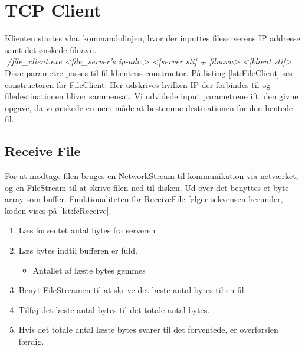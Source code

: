 \section{TCP Client}
Klienten startes vha. kommandolinjen, hvor der inputtes fileserverens IP addresse samt det ønskede filnavn. \\ \textit{./file\_client.exe  <file\_server’s ip-adr.> <[server sti] + filnavn> <[klient sti]>} \\

Disse parametre passes til fil klientens constructor. På listing \ref{lst:FileClient} ses constructoren for FileClient. Her udskrives hvilken IP der forbindes til og filedestinationen bliver sammensat. Vi udvidede input parametrene ift. den givne opgave, da vi ønskede en nem måde at bestemme destinationen for den hentede fil.


\subsection{Receive File}
For at modtage filen bruges en NetworkStream til kommunikation via netværket, og en FileStream til at skrive filen ned til disken. Ud over det benyttes et byte array som buffer. Funktionaliteten for ReceiveFile følger sekvensen herunder, koden vises på \ref{lst:fcReceive}.

\begin{enumerate}
	\item Læs forventet antal bytes fra serveren
	\item Læs bytes indtil bufferen er fuld.
	\begin{itemize}
		\item Antallet af læste bytes gemmes
	\end{itemize}
	\item Benyt FileStreamen til at skrive det læste antal bytes til en fil.
	\item Tilføj det læste antal bytes til det totale antal bytes.
	\item Hvis det totale antal læste bytes svarer til det forventede, er overførslen færdig.
\end{enumerate}
\newpage
